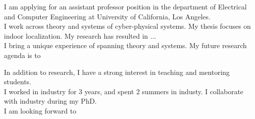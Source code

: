 \documentclass[10pt]{article}
\begin{document}
I am applying for an assistant professor position in the department of Electrical and Computer Engineering at University of California, Los Angeles. \\

I work across theory and systems of cyber-physical systems.  My thesis focuses on indoor localization. My research has resulted in ...\\
I bring a unique experience of spanning theory and systems.
My future research agenda is to 

In addition to research, I have a strong interest in teaching and mentoring students.\\

I worked in industry for 3 years, and spent 2 summers in industy. I collaborate with industry during my PhD.\\
I am looking forward to 
\end{document}
